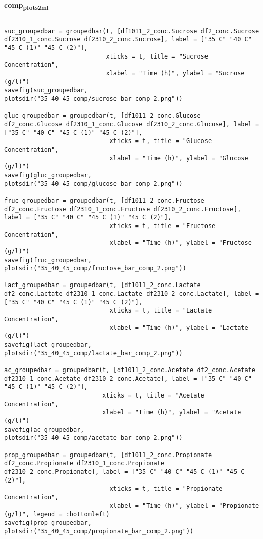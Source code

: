 \documentclass[11pt]{article}
\begin{document}
\textbf{comp\textsubscript{plots}\textsubscript{2}\textsubscript{ml}}
\begin{verbatim}

suc_groupedbar = groupedbar(t, [df1011_2_conc.Sucrose df2_conc.Sucrose df2310_1_conc.Sucrose df2310_2_conc.Sucrose], label = ["35 C" "40 C" "45 C (1)" "45 C (2)"],
                            xticks = t, title = "Sucrose Concentration",
                            xlabel = "Time (h)", ylabel = "Sucrose (g/l)")
savefig(suc_groupedbar, plotsdir("35_40_45_comp/sucrose_bar_comp_2.png"))

gluc_groupedbar = groupedbar(t, [df1011_2_conc.Glucose df2_conc.Glucose df2310_1_conc.Glucose df2310_2_conc.Glucose], label = ["35 C" "40 C" "45 C (1)" "45 C (2)"],
                             xticks = t, title = "Glucose Concentration",
                             xlabel = "Time (h)", ylabel = "Glucose (g/l)")
savefig(gluc_groupedbar, plotsdir("35_40_45_comp/glucose_bar_comp_2.png"))

fruc_groupedbar = groupedbar(t, [df1011_2_conc.Fructose df2_conc.Fructose df2310_1_conc.Fructose df2310_2_conc.Fructose], label = ["35 C" "40 C" "45 C (1)" "45 C (2)"],
                             xticks = t, title = "Fructose Concentration",
                             xlabel = "Time (h)", ylabel = "Fructose (g/l)")
savefig(fruc_groupedbar, plotsdir("35_40_45_comp/fructose_bar_comp_2.png"))

lact_groupedbar = groupedbar(t, [df1011_2_conc.Lactate df2_conc.Lactate df2310_1_conc.Lactate df2310_2_conc.Lactate], label = ["35 C" "40 C" "45 C (1)" "45 C (2)"],
                             xticks = t, title = "Lactate Concentration",
                             xlabel = "Time (h)", ylabel = "Lactate (g/l)")
savefig(lact_groupedbar, plotsdir("35_40_45_comp/lactate_bar_comp_2.png"))

ac_groupedbar = groupedbar(t, [df1011_2_conc.Acetate df2_conc.Acetate df2310_1_conc.Acetate df2310_2_conc.Acetate], label = ["35 C" "40 C" "45 C (1)" "45 C (2)"],
                           xticks = t, title = "Acetate Concentration",
                           xlabel = "Time (h)", ylabel = "Acetate (g/l)")
savefig(ac_groupedbar, plotsdir("35_40_45_comp/acetate_bar_comp_2.png"))

prop_groupedbar = groupedbar(t, [df1011_2_conc.Propionate df2_conc.Propionate df2310_1_conc.Propionate df2310_2_conc.Propionate], label = ["35 C" "40 C" "45 C (1)" "45 C (2)"],
                             xticks = t, title = "Propionate Concentration",
                             xlabel = "Time (h)", ylabel = "Propionate (g/l)", legend = :bottomleft)
savefig(prop_groupedbar, plotsdir("35_40_45_comp/propionate_bar_comp_2.png"))


\end{verbatim}
\end{document}
